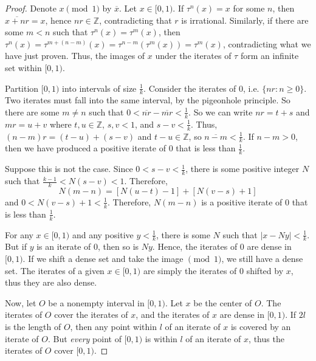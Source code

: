 \documentclass[10pt]{article}
\newcommand{\Z}{\mathbb{Z}}
\renewcommand{\bar}{\overline}
\begin{document}
\begin{enumerate}
\begin{enumerate}
\begin{proof}
Denote $x \pmod{1}$ by $\bar{x}$.  Let $x \in [0,1)$.  If $\tau^n(x) = x$ for some $n$, then $\bar{x + nr} = x$, hence $nr \in \Z$, contradicting that $r$ is irrational.  Similarly, if there are some $m<n$ such that $\tau^n(x) = \tau^m(x)$, then $\tau^n(x) = \tau^{m + (n-m)}(x) = \tau^{n-m}(\tau^{m}(x)) = \tau^m(x)$, contradicting what we have just proven.  Thus, the images of $x$ under the iterates of $\tau$ form an infinite set within $[0,1)$.

Partition $[0,1)$ into intervals of size $\frac{1}{k}$.  Consider the iterates of $0$, i.e. $\{nr : n \geq 0\}$.  Two iterates must fall into the same interval, by the pigeonhole principle.  So there are some $m\neq n$ such that $0 < \bar{nr} - \bar{mr} < \frac{1}{k}$.  So we can write $nr = t + s$ and $mr = u + v$ where $t,u \in \Z$, $s,v < 1$, and $s-v < \frac1k$.  Thus, $(n-m)r = (t-u) + (s-v)$ and $t-u \in \Z$, so $\bar{n-m} < \frac1k$.  If $n-m > 0$, then we have produced a positive iterate of $0$ that is less than $\frac1k$.

Suppose this is not the case.  Since $0 < s-v < \frac1k$, there is some positive integer $N$ such that $\frac{k-1}{k} < N(s-v) < 1$.  Therefore, $$N(m-n) = [N(u-t)-1] + [N(v-s)+1]$$
and $0 < N(v-s)+1 < \frac1k$.  Therefore, $N(m-n)$ is a positive iterate of $0$ that is less than $\frac1k$.

For any $x \in [0,1)$ and any positive $y < \frac1k$, there is some $N$ such that $|x - Ny| < \frac{1}{k}$.  But if $y$ is an iterate of $0$, then so is $Ny$.  Hence, the iterates of $0$ are dense in $[0,1)$.  If we shift a dense set and take the image $\pmod{1}$, we still have a dense set.  The iterates of a given $x \in [0,1)$ are simply the iterates of $0$ shifted by $x$, thus they are also dense.

Now, let $O$ be a nonempty interval in $[0,1)$.  Let $x$ be the center of $O$.  The iterates of $O$ cover the iterates of $x$, and the iterates of $x$ are dense in $[0,1)$.  If $2l$ is the length of $O$, then any point within $l$ of an iterate of $x$ is covered by an iterate of $O$.  But \emph{every} point of $[0,1)$ is within $l$ of an iterate of $x$, thus the iterates of $O$ cover $[0,1)$.


\end{proof}
\end{enumerate}
\end{enumerate}
\end{document}

